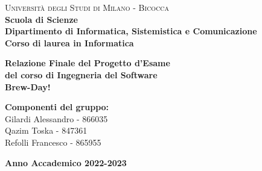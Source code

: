 \documentclass[a4paper,12pt]{report}
\begin{document}
    
    \begin{titlepage}
        
        \noindent
        \begin{minipage}[t]{0.19\textwidth}
        \end{minipage}
        \begin{minipage}[t]{0.81\textwidth}
        {
                {\textsc{Università degli Studi di Milano - Bicocca}} \\
                \textbf{Scuola di Scienze} \\
                \textbf{Dipartimento di Informatica, Sistemistica e Comunicazione} \\
                \textbf{Corso di laurea in Informatica} \\
                \par
        }
        \end{minipage}
        
	\vspace{55mm}
        
	\begin{center}
            {\LARGE{
                    \textbf{Relazione Finale del Progetto d'Esame\\ del corso di Ingegneria del Software \\ Brew-Day! }
                    \par
            }}
        \end{center}
        
        \vspace{50mm}
        
        \begin{flushright}
            {\large \textbf{Componenti del gruppo:}} \\
            \large{Gilardi Alessandro - 866035} \\
            \large{Qazim Toska - 847361} \\
            \large{Refolli Francesco - 865955} \\
        \end{flushright}
        
        \vspace{40mm}
        \begin{center}
            {\large{\bf Anno Accademico 2022-2023}}
        \end{center}

        \restoregeometry
        
    \end{titlepage}
    
\end{document}

